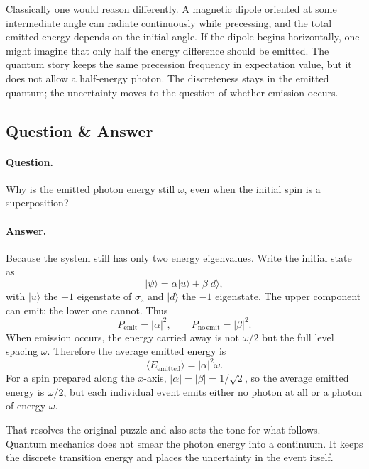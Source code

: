 Classically one would reason differently. A magnetic dipole oriented at some intermediate angle can radiate continuously while precessing, and the total emitted energy depends on the initial angle. If the dipole begins horizontally, one might imagine that only half the energy difference should be emitted. The quantum story keeps the same precession frequency in expectation value, but it does not allow a half-energy photon. The discreteness stays in the emitted quantum; the uncertainty moves to the question of whether emission occurs.

\subsection{Question \& Answer}

\paragraph{Question.} Why is the emitted photon energy still \(\omega\), even when the initial spin is a superposition?

\paragraph{Answer.} Because the system still has only two energy eigenvalues. Write the initial state as
\begin{equation}
|\psi\rangle=\alpha|u\rangle+\beta|d\rangle,
\end{equation}
with \(|u\rangle\) the \(+1\) eigenstate of \(\sigma_z\) and \(|d\rangle\) the \(-1\) eigenstate. The upper component can emit; the lower one cannot. Thus
\begin{equation}
P_{\mathrm{emit}}=|\alpha|^2,
\qquad
P_{\mathrm{no\,emit}}=|\beta|^2.
\end{equation}
When emission occurs, the energy carried away is not \(\omega/2\) but the full level spacing \(\omega\). Therefore the average emitted energy is
\begin{equation}
\langle E_{\mathrm{emitted}}\rangle=|\alpha|^2\omega.
\end{equation}
For a spin prepared along the \(x\)-axis, \(|\alpha|=|\beta|=1/\sqrt2\), so the average emitted energy is \(\omega/2\), but each individual event emits either no photon at all or a photon of energy \(\omega\).

That resolves the original puzzle and also sets the tone for what follows. Quantum mechanics does not smear the photon energy into a continuum. It keeps the discrete transition energy and places the uncertainty in the event itself.

